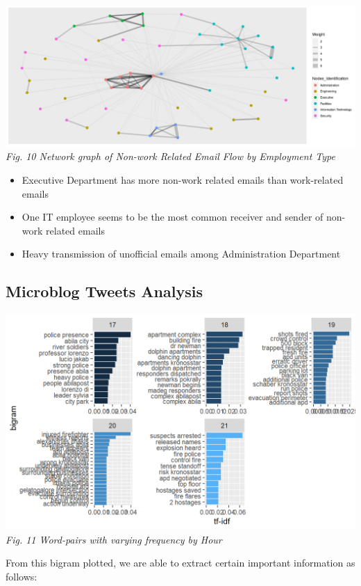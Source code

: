 \documentclass{acm_proc_article-sp}
\providecommand{\tightlist}{%
  \setlength{\itemsep}{0pt}\setlength{\parskip}{0pt}}
\begin{document}
\includegraphics{img/image15.png} \emph{Fig. 10 Network graph of
Non-work Related Email Flow by Employment Type}

\begin{itemize}
\tightlist
\item
  Executive Department has more non-work related emails than
  work-related emails
\item
  One IT employee seems to be the most common receiver and sender of
  non-work related emails
\item
  Heavy transmission of unofficial emails among Administration
  Department
\end{itemize}

\hypertarget{microblog-tweets-analysis}{%
\subsection{Microblog Tweets Analysis}\label{microblog-tweets-analysis}}

\includegraphics{img/image08.png} \emph{Fig. 11 Word-pairs with varying
frequency by Hour}

From this bigram plotted, we are able to extract certain important
information as follows:
\end{document}

